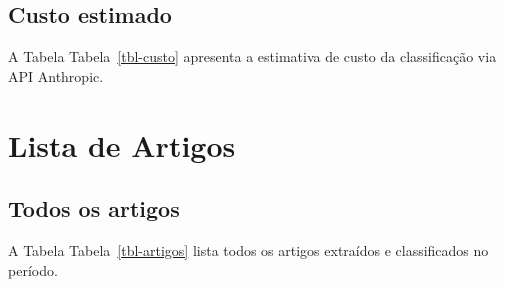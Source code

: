 \documentclass[
  brazilian,
  11pt,
  letterpaper,
  DIV=11,
  numbers=noendperiod]{scrartcl}
\begin{document}
\subsection{Custo estimado}\label{custo-estimado}

A Tabela Tabela~\ref{tbl-custo} apresenta a estimativa de custo da
classificação via API Anthropic.

\begin{table}

\caption{\label{tbl-custo}Custo estimado da classificação.}


\end{table}%

\section{Lista de Artigos}\label{lista-de-artigos}

\subsection{Todos os artigos}\label{todos-os-artigos}

A Tabela Tabela~\ref{tbl-artigos} lista todos os artigos extraídos e
classificados no período.
\end{document}
